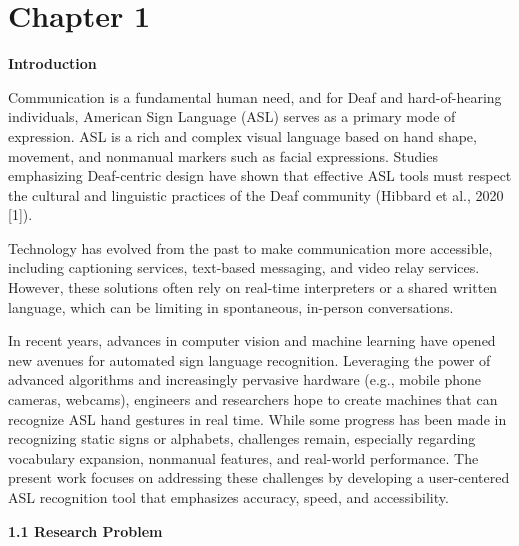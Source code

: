\documentclass[12pt]{article}
\begin{document}
\clearpage
{}
\setcounter{page}{1}
\doublespacing

\newpage
\tableofcontents
\newpage

\doublespacing

\newpage
\section*{Chapter 1}
\begin{center}
\large \textbf{Introduction}
\end{center}

Communication is a fundamental human need, and for Deaf and hard-of-hearing individuals, 
American Sign Language (ASL) serves as a primary mode of expression. ASL is a rich and 
complex visual language based on hand shape, movement, and nonmanual markers such as facial 
expressions. Studies emphasizing Deaf-centric design have shown that effective ASL tools must 
respect the cultural and linguistic practices of the Deaf community (Hibbard et al., 2020 [1]).

Technology has evolved from the past to make communication more accessible, including captioning 
services, text-based messaging, and video relay services. However, these solutions often rely on 
real-time interpreters or a shared written language, which can be limiting in spontaneous, in-person 
conversations.

In recent years, advances in computer vision and machine learning have opened new avenues for 
automated sign language recognition. Leveraging the power of advanced algorithms and increasingly 
pervasive hardware (e.g., mobile phone cameras, webcams), engineers and researchers hope to create 
machines that can recognize ASL hand gestures in real time. While some progress has been made in 
recognizing static signs or alphabets, challenges remain, especially regarding vocabulary expansion, 
nonmanual features, and real-world performance. The present work focuses on addressing these 
challenges by developing a user-centered ASL recognition tool that emphasizes accuracy, speed, 
and accessibility.

\vspace{1.5em}
\noindent
\textbf{1.1 Research Problem}
\vspace{1.5em}
\end{document}

